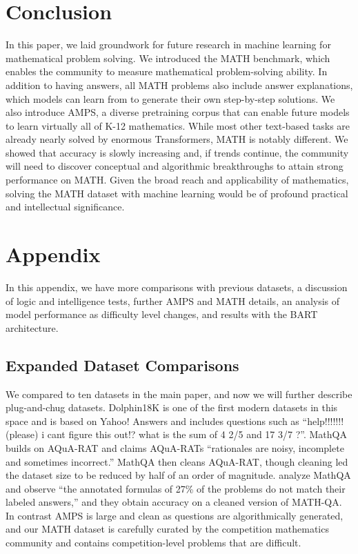\documentclass{article}
\begin{document}
 \section{Conclusion}
In this paper, we laid groundwork for future research in machine learning for mathematical problem solving. We introduced the MATH benchmark, which enables the community to measure mathematical problem-solving ability. In addition to having answers, all MATH problems also include answer explanations, which models can learn from to generate their own step-by-step solutions. We also introduce AMPS, a diverse pretraining corpus that can enable future models to learn virtually all of K-12 mathematics. While most other text-based tasks are already nearly solved by enormous Transformers, MATH is notably different. We showed that accuracy is slowly increasing and, if trends continue, the community will need to discover conceptual and algorithmic breakthroughs to attain strong performance on MATH. Given the broad reach and applicability of mathematics, solving the MATH dataset with machine learning would be of profound practical and intellectual significance.


 







\newpage
\appendix
\section{Appendix}
In this appendix, we have more comparisons with previous datasets, a discussion of logic and intelligence tests, further  AMPS and MATH details, an analysis of model performance as difficulty level changes, and results with the BART architecture.

\subsection{Expanded Dataset Comparisons} We compared to ten datasets in the main paper, and now we will further describe plug-and-chug datasets. Dolphin18K \citep{Huang2016HowWD} is one of the first modern datasets in this space and is based on Yahoo{!} Answers and includes questions such as ``help!!!!!!!(please) i cant figure this out!? what is the sum of 4 2/5 and 17 3/7 ?''. MathQA \citep{Amini2019MathQATI} builds on AQuA-RAT \citep{Ling2017ProgramIB} and claims AQuA-RATs ``rationales are noisy, incomplete and sometimes incorrect.'' MathQA then cleans AQuA-RAT, though cleaning led the dataset size to be reduced by half of an order of magnitude. \citet{Miao2020ADC} analyze MathQA and observe ``the annotated formulas of 27\% of the problems do not match their labeled answers,'' and they obtain  accuracy on a cleaned version of MATH-QA. In contrast AMPS is large and clean as questions are algorithmically generated, and our MATH dataset is carefully curated by the competition mathematics community and contains competition-level problems that are difficult.
\end{document}
